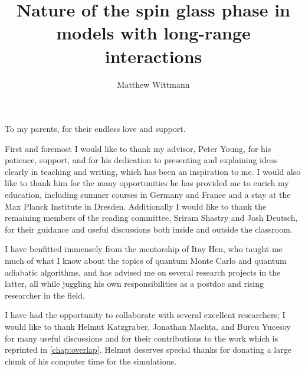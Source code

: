 \documentclass[phd]{ucbthesis}
\begin{document}
\title{Nature of the spin glass phase in models with long-range interactions}
\author{Matthew Wittmann}

\maketitle
\approvalpage
\copyrightpage

\begin{frontmatter}
\DoubleSpacing

\clearpage
\tableofcontents
\clearpage
\listoffigures
\clearpage
\listoftables
\clearpage

\begin{dedication}
\begin{center}
  To my parents,
  for their endless love and support.
\end{center}
\end{dedication}

\begin{acknowledgements}
  First and foremost I would like to thank my advisor, Peter Young, for his
  patience, support, and for his dedication to presenting and explaining ideas
  clearly in teaching and writing, which has been an inspiration to me. I would
  also like to thank him for the many opportunities he has provided me to
  enrich my education, including summer courses in Germany and France and a
  stay at the Max Planck Institute in Dresden. Additionally I would like to
  thank the remaining members of the reading committee, Sriram Shastry and Josh
  Deutsch, for their guidance and useful discussions both inside and outside
  the classroom.

  I have benfitted immensely from the mentorship of Itay Hen, who taught me
  much of what I know about the topics of quantum Monte Carlo and quantum
  adiabatic algorithms, and has advised me on several research projects in the
  latter, all while juggling his own responsibilities as a postdoc and rising
  researcher in the field.

  I have had the opportunity to collaborate with several excellent researchers;
  I would like to thank Helmut Katzgraber, Jonathan Machta, and Burcu Yucesoy
  for many useful discussions and for their contributions to the work which is
  reprinted in \cref{chap:overlap}. Helmut deserves special thanks for donating
  a large chunk of his computer time for the simulations.


\end{acknowledgements}
\end{frontmatter}
\end{document}
